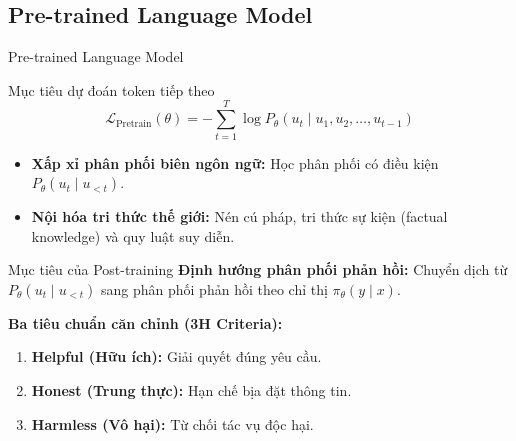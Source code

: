 
\subsection{Pre-trained Language Model}

\begin{frame}{Pre-trained Language Model}
  \begin{block}{Mục tiêu dự đoán token tiếp theo}
    \[
      \mathcal{L}_{\text{Pretrain}}(\theta) = -\sum_{t=1}^{T} \log P_\theta(u_t \mid u_1, u_2, \dots, u_{t-1})
    \]
  \end{block}

  \small
  \begin{itemize}\setlength{\itemsep}{4pt}
    \item \textbf{Xấp xỉ phân phối biên ngôn ngữ:} Học phân phối có điều kiện $P_\theta(u_t \mid u_{<t})$.
    \item \textbf{Nội hóa tri thức thế giới:} Nén cú pháp, tri thức sự kiện (factual knowledge) và quy luật suy diễn.
  \end{itemize}
  \par\vspace{0pt}
\end{frame}


\begin{frame}{Mục tiêu của Post-training}
  \small
  \textbf{Định hướng phân phối phản hồi:} Chuyển dịch từ $P_\theta(u_t \mid u_{<t})$ sang phân phối phản hồi theo chỉ thị $\pi_\theta(y \mid x)$.
  
  \vspace{0.5cm}

  \textbf{Ba tiêu chuẩn căn chỉnh (3H Criteria):}
      \begin{enumerate}\small\setlength{\itemsep}{3pt}
        \item \textbf{Helpful (Hữu ích):} Giải quyết đúng yêu cầu.
        \item \textbf{Honest (Trung thực):} Hạn chế bịa đặt thông tin.
        \item \textbf{Harmless (Vô hại):} Từ chối tác vụ độc hại.
      \end{enumerate}
  \par\vspace{0pt}
\end{frame}

